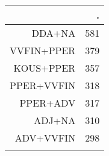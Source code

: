 \begin{tabular}{rr}
  \lsptoprule
 & . \\ 
  \midrule
DDA+NA & 581 \\ 
  VVFIN+PPER & 379 \\ 
  KOUS+PPER & 357 \\ 
  PPER+VVFIN & 318 \\ 
  PPER+ADV & 317 \\ 
  ADJ+NA & 310 \\ 
  ADV+VVFIN & 298 \\ 
   \lspbottomrule
\end{tabular}
